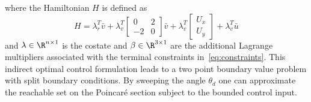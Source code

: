 where the Hamiltonian \(H\) is defined as
\begin{equation}
	H = \lambda_r^T \bar{v} + \lambda_v^T \begin{bmatrix}0 & 2\\-2 & 0 \end{bmatrix} \bar{v} + \lambda_v^T \begin{bmatrix} U_x \\ U_y \end{bmatrix} + \lambda_v^T \bar{u}
	\label{eq:hamiltonian_opt}
\end{equation}
and \(\lambda \in \R^{n \times 1}\) is the costate and \(\beta \in \R^{3 \times 1} \) are the additional Lagrange multipliers associated with the terminal constraints in~\eqref{eq:constraints}.
This indirect optimal control formulation leads to a two point boundary value problem with split boundary conditions. 
By sweeping the angle \( \theta_d \) one can approximate the reachable set on the Poincar\'e section subject to the bounded control input. 

